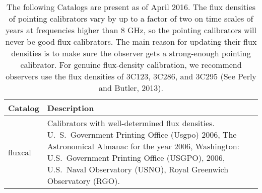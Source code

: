 \vspace{0.2cm}

\begin{table}[!h]
\begin{center}
\caption[Available catalogs]{The following Catalogs are present as of April 
2016. The flux densities of pointing calibrators vary by up to a factor of 
two on time scales of years at frequencies higher than 8 GHz, so the pointing 
calibrators will never be good flux calibrators. The main reason for 
updating their flux  densities is to make sure the observer gets a 
strong-enough pointing calibrator. For genuine flux-density calibration, we
recommend observers use the flux densities of 3C123, 3C286, and 3C295
(See Perly and Butler, 2013).\label{table:catalogs}\\}
\begin{tabular}{l p{}}
\toprule
Catalog & Description \\ \midrule

fluxcal &
Calibrators with well-determined flux densities. U.~S.~Government Printing
Office (Usgpo) 2006, The Astronomical Almanac for the year 2006, Washington:
U.S.~Government Printing Office (USGPO), 2006, U.S.~Naval Observatory (USNO),
Royal Greenwich Observatory (RGO). \\ \midrule


\end{tabular}
\end{center}
\end{table}
